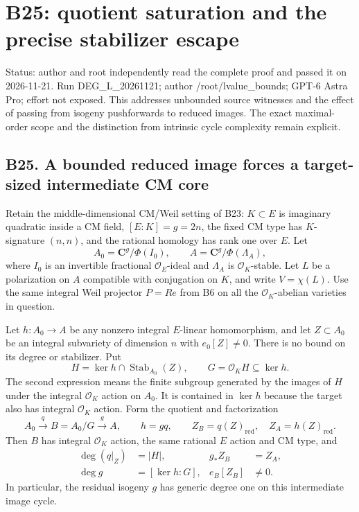 \providecommand{\tightlist}{\setlength{\itemsep}{0pt}\setlength{\parskip}{0pt}}
\section{B25: quotient saturation and the precise stabilizer escape}\label{b25-quotient-saturation-and-the-precise-stabilizer-escape}

Status: author and root independently read the complete proof and passed it on 2026-11-21. Run DEG\_L\_20261121; author /root/lvalue\_bounds; GPT-6 Astra Pro; effort not exposed. This addresses unbounded source witnesses and the effect of passing from isogeny pushforwards to reduced images. The exact maximal-order scope and the distinction from intrinsic cycle complexity remain explicit.

\subsection{B25. A bounded reduced image forces a target-sized intermediate CM core}\label{b25.-a-bounded-reduced-image-forces-a-target-sized-intermediate-cm-core}

Retain the middle-dimensional CM/Weil setting of B23: \(K\subset E\) is imaginary quadratic inside a CM field, \([E:K]=g=2n\), the fixed CM type has \(K\)-signature \((n,n)\), and the rational homology has rank one over \(E\). Let \[
 A_0=\mathbf C^g/\Phi(I_0),\qquad
 A=\mathbf C^g/\Phi(\Lambda_A),
\] where \(I_0\) is an invertible fractional \(\mathcal O_E\)-ideal and \(\Lambda_A\) is \(\mathcal O_K\)-stable. Let \(L\) be a polarization on \(A\) compatible with conjugation on \(K\), and write \(V=\chi(L)\). Use the same integral Weil projector \(P=Re\) from B6 on all the \(\mathcal O_K\)-abelian varieties in question.

Let \(h:A_0\to A\) be any nonzero integral \(E\)-linear homomorphism, and let \(Z\subset A_0\) be an integral subvariety of dimension \(n\) with \(e_0[Z]\ne0\). There is no bound on its degree or stabilizer. Put \[
 H=\ker h\cap\operatorname{Stab}_{A_0}(Z),
 \qquad
 G=\mathcal O_K H\subseteq\ker h.
\tag{B25.1}
\] The second expression means the finite subgroup generated by the images of \(H\) under the integral \(\mathcal O_K\) action on \(A_0\). It is contained in \(\ker h\) because the target also has integral \(\mathcal O_K\) action. Form the quotient and factorization \[
 A_0\xrightarrow{q}B=A_0/G\xrightarrow{g}A,
 \qquad h=gq,
 \qquad Z_B=q(Z)_{\mathrm{red}},\quad Z_A=h(Z)_{\mathrm{red}}.
\tag{B25.2}
\] Then \(B\) has integral \(\mathcal O_K\) action, the same rational \(E\) action and CM type, and \[
 \begin{aligned}
 \deg(q|_Z)&=|H|,&g_*Z_B&=Z_A,\\
 \deg g&=[\ker h:G],&e_B[Z_B]&\ne0.
 \end{aligned}
\tag{B25.3}
\] In particular, the residual isogeny \(g\) has generic degree one on this intermediate image cycle.

